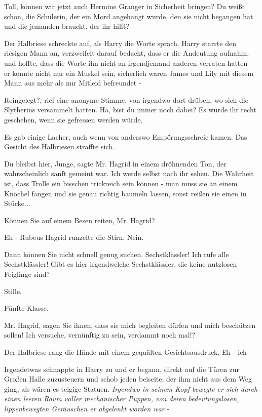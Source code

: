 \glqq{}Toll, können wir jetzt auch Hermine Granger in Sicherheit bringen? Du
weißt schon, die Schülerin, der ein Mord angehängt wurde, den sie nicht begangen
hat und die jemanden braucht, der ihr hilft?\grqq{}

Der Halbriese schreckte auf, als Harry die Worte sprach. Harry starrte den
riesigen Mann an, verzweifelt darauf bedacht, dass er die Andeutung aufnahm, und
hoffte, dass die Worte ihn nicht an irgendjemand anderen verraten hatten - er
konnte nicht nur ein Muskel sein, sicherlich waren James und Lily mit diesem
Mann aus mehr als nur Mitleid befreundet -

\glqq{}Reingelegt?\grqq{}, rief eine anonyme Stimme, von irgendwo dort drüben, wo
sich die Slytherins versammelt hatten. \glqq{}Ha, bist du immer noch dabei? Es
würde ihr recht geschehen, wenn sie gefressen werden würde.\grqq{}

Es gab einige Lacher, auch wenn von anderswo Empörungsschreie kamen. Das Gesicht
des Halbriesen straffte sich.

\glqq{}Du bleibst hier, Junge\grqq{}, sagte Mr. Hagrid in einem dröhnenden Ton,
der wahrscheinlich sanft gemeint war. \glqq{}Ich werde selbst nach ihr sehen. Die
Wahrheit ist, dass Trolle ein bisschen trickreich sein können - man muss sie an
einem Knöchel fangen und sie genau richtig baumeln lassen, sonst reißen sie
einen in Stücke...\grqq{}

\glqq{}Können Sie auf einem Besen reiten, Mr. Hagrid?\grqq{}

\glqq{}Eh -\grqq{} Rubeus Hagrid runzelte die Stirn. \glqq{}Nein.\grqq{}

\glqq{}Dann können Sie nicht schnell genug suchen. Sechstklässler! Ich rufe alle
Sechstklässler! Gibt es hier irgendwelche Sechstklässler, die keine nutzlosen
Feiglinge sind?\grqq{}

Stille.

\glqq{}Fünfte Klasse\grqq{}.

Mr. Hagrid, sagen Sie ihnen, dass sie mich begleiten dürfen und mich beschützen
sollen! Ich versuche, vernünftig zu sein, verdammt noch mal!?\grqq{}

Der Halbriese rang die Hände mit einem gequälten Gesichtsausdruck. \glqq{}Eh -
ich -\grqq{}

Irgendetwas schnappte in Harry zu und er begann, direkt auf die Türen zur Großen
Halle zuzusteuern und schob jeden beiseite, der ihm nicht aus dem Weg ging, als
wären es teigige Statuen. \emph{Irgendwo in seinem Kopf bewegte er sich durch
einen leeren Raum voller mechanischer Puppen, von deren bedeutungslosen,
lippenbewegten Geräuschen er abgelenkt worden war} -

